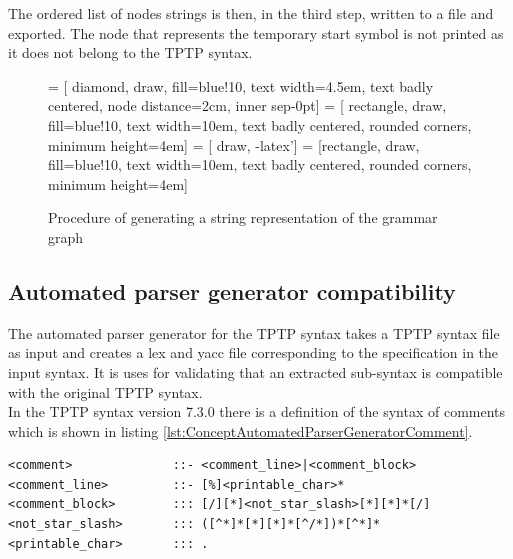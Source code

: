 The ordered list of nodes strings is then, in the third step, written to a file and exported.
The node that represents the temporary start symbol is not printed as it does not belong to the \ac{TPTP} syntax. 
 
\begin{figure}[H]
 = [ diamond, draw, fill=blue!10, text width=4.5em, text badly centered, node distance=2cm, inner sep-0pt]  
 = [ rectangle, draw, fill=blue!10, text width=10em, text badly centered, rounded corners, minimum height=4em]  
 = [ draw, -latex']  
 = [rectangle, draw, fill=blue!10, text width=10em, text badly centered, rounded corners, minimum height=4em]  
\begin{center}
\end{center}
\caption{Procedure of generating a string representation of the grammar graph}
\label{fig:ConceptOutputGrammarGraphProcedure}
\end{figure}

\subsection{Automated parser generator compatibility}\label{sec:ConceptAutomatedParserGenerator}

The automated parser generator for the \ac{TPTP} syntax \cite{VS06} takes a \ac{TPTP} syntax file as input and creates a lex and yacc file corresponding to the specification in the input syntax. It is uses for validating that an extracted sub-syntax is compatible with the original \ac{TPTP} syntax.\\
In the \ac{TPTP} syntax version 7.3.0 there is a definition of the syntax of comments which is shown in listing \ref{lst:ConceptAutomatedParserGeneratorComment}.
\begin{lstlisting}[language=none, basicstyle=\scriptsize, caption=Comment syntax definition in the \ac{TPTP} syntax, label= lst:ConceptAutomatedParserGeneratorComment]
<comment>              ::- <comment_line>|<comment_block> 
<comment_line>         ::- [%]<printable_char>*
<comment_block>        ::: [/][*]<not_star_slash>[*][*]*[/]
<not_star_slash>       ::: ([^*]*[*][*]*[^/*])*[^*]*
<printable_char>       ::: .
\end{lstlisting}

